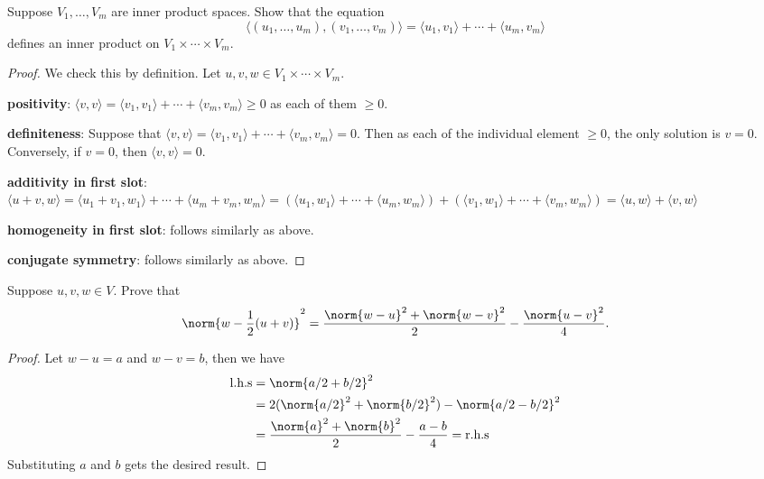\documentclass{extarticle}
\begin{document}
\begin{problem}{29}
    Suppose \(V_1, \ldots, V_m\) are inner product spaces. Show that the equation
    \[\langle (u_1, \ldots, u_m), (v_1, \ldots, v_m) \rangle = \langle u_1,v_1 \rangle
    + \cdots + \langle u_m,v_m \rangle\]
    defines an inner product on \(V_1 \times \cdots \times V_m\).
\end{problem}

\begin{proof}
We check this by definition. Let \(u, v, w \in V_1 \times \cdots \times V_m\).

\textbf{positivity}: \(\langle v,v \rangle
= \langle v_1,v_1 \rangle + \cdots + \langle v_m,v_m \rangle \geq 0 \)
as each of them \(\geq 0\).

\textbf{definiteness}: Suppose that \(\langle v,v \rangle
= \langle v_1,v_1 \rangle + \cdots + \langle v_m,v_m \rangle = 0 \). Then as each of the individual
element \(\geq 0\), the only solution is \(v = 0\). Conversely, if \(v = 0\), then \(\langle v,v \rangle = 0\).

\textbf{additivity in first slot}: \(\langle u+v,w \rangle
= \langle u_1 + v_1, w_1 \rangle + \cdots + \langle u_m + v_m, w_m \rangle
= (\langle u_1,w_1 \rangle + \cdots + \langle u_m,w_m \rangle)
+ (\langle v_1,w_1 \rangle + \cdots + \langle v_m,w_m \rangle)
= \langle u,w \rangle + \langle v,w \rangle\)

\textbf{homogeneity in first slot}: follows similarly as above.

\textbf{conjugate symmetry}: follows similarly as above.
\end{proof}

\begin{problem}{31}
    Suppose \(u, v, w \in V\). Prove that
    \[\norm{w - \frac{1}{2}(u+v)}^2 = \frac{\norm{w - u}^2 + \norm{w - v}^2}{2} - \frac{\norm{u-v}^2}{4}.\]
\end{problem}

\begin{proof}
Let \(w - u = a\) and \(w - v = b\), then we have
\begin{align*}
    \text{l.h.s}
    &= \norm{ a/2  + b/2  }^2 \\
    &=  2(\norm{a/2}^2 + \norm{b/2}^2) - \norm{a/2 - b/2}^2 \\
    &= \frac{\norm{a}^2 + \norm{b}^2}{2} - \frac{a - b}{4} = \text{r.h.s}
\end{align*}
Substituting \(a\) and \(b\) gets the desired result.
\end{proof}
\end{document}
